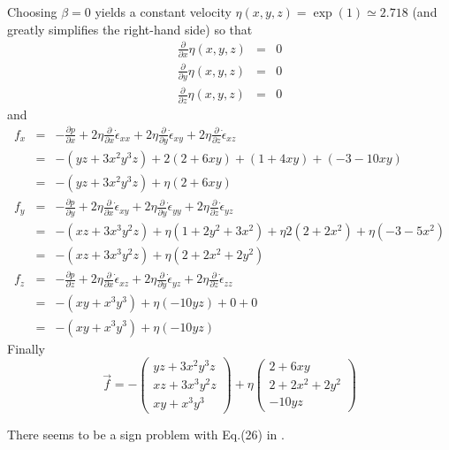Choosing $\beta=0$ yields a constant velocity $\eta(x,y,z) = \exp(1) \simeq 2.718$
(and greatly simplifies the right-hand side) so that 
\begin{eqnarray}
\frac{\partial }{\partial x} \eta(x,y,z) &=& 0 \\
\frac{\partial }{\partial y} \eta(x,y,z) &=& 0 \\
\frac{\partial }{\partial z} \eta(x,y,z) &=& 0
\end{eqnarray}
and 
\begin{eqnarray}
f_x 
&=& 
-\frac{\partial p}{\partial x} 
+2\eta\frac{\partial}{\partial x} \dot{\epsilon}_{xx}
+2\eta\frac{\partial}{\partial y} \dot{\epsilon}_{xy}
+2\eta\frac{\partial}{\partial z} \dot{\epsilon}_{xz} \nonumber\\
&=&
-(yz+3x^2y^3z)
+ 2(2 +6xy) + (1+4xy) + (-3 -10xy)   \nonumber\\
&=&
-(yz+3x^2y^3z)
+\eta(2+6xy ) \nonumber\\
f_y 
&=&  
-\frac{\partial p}{\partial y} 
+2\eta\frac{\partial}{\partial x} \dot{\epsilon}_{xy}
+2\eta\frac{\partial}{\partial y} \dot{\epsilon}_{yy}
+2\eta\frac{\partial}{\partial z} \dot{\epsilon}_{yz}  \nonumber\\
&=&
-(xz +3x^3y^2z)
+
\eta(1+2y^2+3x^2)
+\eta 2( 2+2x^2 )  
+\eta(-3-5x^2) \nonumber\\
&=&
-(xz +3x^3y^2z)
+ \eta ( 2 + 2x^2 +  2y^2)
\nonumber\\ 
f_z 
&=&
-\frac{\partial p}{\partial z} 
+2\eta\frac{\partial}{\partial x} \dot{\epsilon}_{xz}
+2\eta\frac{\partial}{\partial y} \dot{\epsilon}_{yz}
+2\eta\frac{\partial}{\partial z} \dot{\epsilon}_{zz}  \nonumber\\
&=&
-(xy+x^3y^3) 
+ \eta (-10yz) + 0 + 0 \nonumber\\
&=&
-(xy+x^3y^3) 
+\eta (-10yz) \nonumber
\end{eqnarray}
Finally
\begin{equation}
\vec{f} = 
-
\left(
\begin{array}{c}
yz+3x^2y^3z\\
xz +3x^3y^2z \\
xy+x^3y^3
\end{array}
\right)
+\eta
\left(
\begin{array}{c}
2+6xy  \\
2 + 2x^2 +  2y^2 \\
-10yz 
\end{array}
\right)
\end{equation}

\begin{remark}
There seems to be a sign problem with Eq.(26) in \cite{busa13}.
\end{remark}

